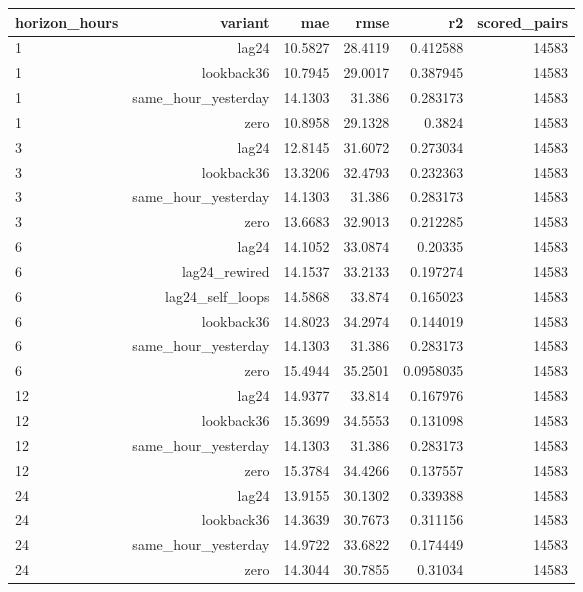 \begin{tabular}{lrrrrr}
\hline
horizon\_hours & variant & mae & rmse & r2 & scored\_pairs \\
\hline
1 & lag24 & 10.5827 & 28.4119 & 0.412588 & 14583 \\
1 & lookback36 & 10.7945 & 29.0017 & 0.387945 & 14583 \\
1 & same\_hour\_yesterday & 14.1303 & 31.386 & 0.283173 & 14583 \\
1 & zero & 10.8958 & 29.1328 & 0.3824 & 14583 \\
3 & lag24 & 12.8145 & 31.6072 & 0.273034 & 14583 \\
3 & lookback36 & 13.3206 & 32.4793 & 0.232363 & 14583 \\
3 & same\_hour\_yesterday & 14.1303 & 31.386 & 0.283173 & 14583 \\
3 & zero & 13.6683 & 32.9013 & 0.212285 & 14583 \\
6 & lag24 & 14.1052 & 33.0874 & 0.20335 & 14583 \\
6 & lag24\_rewired & 14.1537 & 33.2133 & 0.197274 & 14583 \\
6 & lag24\_self\_loops & 14.5868 & 33.874 & 0.165023 & 14583 \\
6 & lookback36 & 14.8023 & 34.2974 & 0.144019 & 14583 \\
6 & same\_hour\_yesterday & 14.1303 & 31.386 & 0.283173 & 14583 \\
6 & zero & 15.4944 & 35.2501 & 0.0958035 & 14583 \\
12 & lag24 & 14.9377 & 33.814 & 0.167976 & 14583 \\
12 & lookback36 & 15.3699 & 34.5553 & 0.131098 & 14583 \\
12 & same\_hour\_yesterday & 14.1303 & 31.386 & 0.283173 & 14583 \\
12 & zero & 15.3784 & 34.4266 & 0.137557 & 14583 \\
24 & lag24 & 13.9155 & 30.1302 & 0.339388 & 14583 \\
24 & lookback36 & 14.3639 & 30.7673 & 0.311156 & 14583 \\
24 & same\_hour\_yesterday & 14.9722 & 33.6822 & 0.174449 & 14583 \\
24 & zero & 14.3044 & 30.7855 & 0.31034 & 14583 \\
\hline
\end{tabular}
